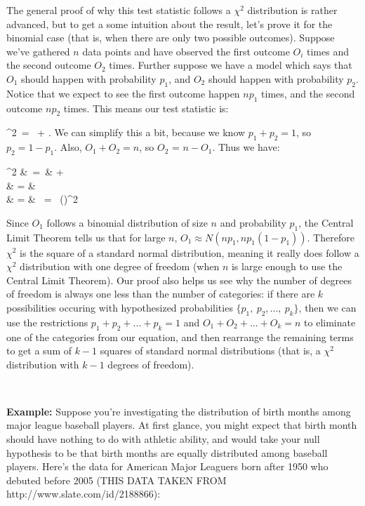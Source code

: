 The general proof of why this test statistic follows a $\chi^2$ distribution is rather advanced, but to get a some intuition about the result, let's prove it for the binomial case (that is, when there are only two possible outcomes).  Suppose we've gathered $n$ data points and have observed the first outcome $O_i$ times and the second outcome $O_2$ times.  Further suppose we have a model which says that $O_1$ should happen with probability $p_1$, and $O_2$ should happen with probability $p_2$.  Notice that we expect to see the first outcome happen $np_1$ times, and the second outcome $np_2$ times.  This means our test statistic is:

\bel
\chi^2\ =\  + .
\eel
We can simplify this a bit, because we know $p_1 + p_2 = 1$, so $p_2 = 1 - p_1$.  Also, $O_1 + O_2 = n$, so $O_2$ = $n - O_1$.  Thus we have:

\bea
\chi^2 &\ =\ &  +  \nonumber\\  & = &  \nonumber\\ & = & \ = \ \left(\right)^2
\eea

Since $O_1$ follows a binomial distribution of size $n$ and probability $p_1$, the Central Limit Theorem tells us that for large $n$, $O_1 \approx N(np_1,np_1(1-p_1))$.  Therefore $\chi^2$ is the square of a standard normal distribution, meaning it really does follow a $\chi^2$ distribution with one degree of freedom (when $n$ is large enough to use the Central Limit Theorem).  Our proof also helps us see why the number of degrees of freedom is always one less than the number of categories: if there are $k$ possibilities occuring with hypothesized probabilities $\{p_1,\ p_2,...,\ p_k\}$, then we can use the restrictions $p_1 + p_2 + ... + p_k =1$ and $O_1 + O_2 + ... + O_k = n$ to eliminate one of the categories from our equation, and then rearrange the remaining terms to get a sum of $k-1$ squares of standard normal distributions (that is, a $\chi^2$ distribution with $k-1$ degrees of freedom).

~

\textbf{Example:} Suppose \ex you're investigating the distribution of birth months among major league baseball players.  At first glance, you might expect that birth month should have nothing to do with athletic ability, and would take your null hypothesis to be that birth months are equally distributed among baseball players.  Here's the data for American Major Leaguers born after 1950 who debuted before 2005 (THIS DATA TAKEN FROM http://www.slate.com/id/2188866):

